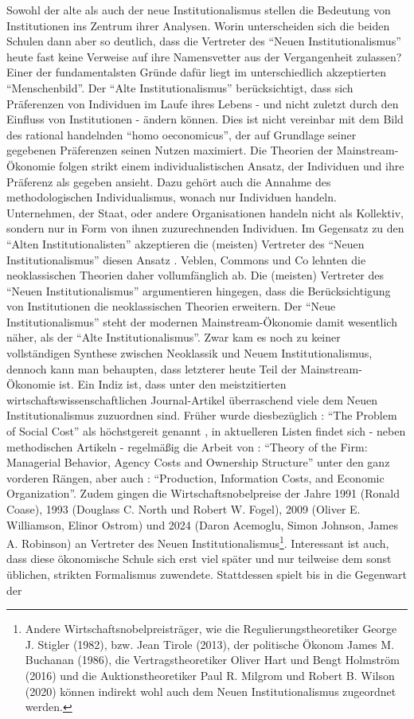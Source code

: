 Sowohl der alte als auch der neue Institutionalismus stellen die Bedeutung von Institutionen ins Zentrum ihrer Analysen. Worin unterscheiden sich die beiden Schulen dann aber so deutlich, dass die Vertreter des "`Neuen Institutionalismus"' heute fast keine Verweise auf ihre Namensvetter aus der Vergangenheit zulassen? Einer der fundamentalsten Gründe dafür liegt im unterschiedlich akzeptierten "`Menschenbild"'. Der "`Alte Institutionalismus"' berücksichtigt, dass sich Präferenzen von Individuen im Laufe ihres Lebens - und nicht zuletzt durch den Einfluss von Institutionen - ändern können. Dies ist nicht vereinbar mit dem Bild des rational handelnden "`homo oeconomicus"', der auf Grundlage seiner gegebenen Präferenzen seinen Nutzen maximiert. Die Theorien der Mainstream-Ökonomie folgen strikt einem individualistischen Ansatz, der Individuen und ihre Präferenz als gegeben ansieht. Dazu gehört auch die Annahme des methodologischen Individualismus, wonach nur Individuen handeln. Unternehmen, der Staat, oder andere Organisationen handeln nicht als Kollektiv, sondern nur in Form von ihnen zuzurechnenden Individuen. Im Gegensatz zu den "`Alten Institutionalisten"' akzeptieren die (meisten) Vertreter des "`Neuen Institutionalismus"' diesen Ansatz \parencite[S. 177]{Hodgson1998}. Veblen, Commons und Co lehnten die neoklassischen Theorien daher vollumfänglich ab. Die (meisten) Vertreter des "`Neuen Institutionalismus"' argumentieren hingegen, dass die Berücksichtigung von Institutionen die neoklassischen Theorien erweitern. Der "`Neue Institutionalismus"' steht der modernen Mainstream-Ökonomie damit wesentlich näher, als der "`Alte Institutionalismus"'. Zwar kam es noch zu keiner vollständigen Synthese zwischen Neoklassik und Neuem Institutionalismus, dennoch kann man behaupten, dass letzterer heute Teil der Mainstream-Ökonomie ist. Ein Indiz ist, dass unter den meistzitierten wirtschaftswissenschaftlichen Journal-Artikel überraschend viele dem Neuen Institutionalismus zuzuordnen sind. Früher wurde diesbezüglich \textcite{Coase1960}: "`The Problem of Social Cost"' als höchstgereit genannt \parencite{Coase1991}, in aktuelleren Listen \parencite{Kim2006, Mergio2016} findet sich - neben methodischen Artikeln - regelmäßig die Arbeit von \textcite{Jensen1976}: "`Theory of the Firm: Managerial Behavior, Agency Costs and Ownership Structure"' unter den ganz vorderen Rängen, aber auch \textcite{Alchian1972}: "`Production, Information Costs, and Economic Organization"'. Zudem gingen die Wirtschaftsnobelpreise der Jahre 1991 (Ronald Coase), 1993 (Douglass C. North und Robert W. Fogel), 2009 (Oliver E. Williamson, Elinor Ostrom) und 2024 (Daron Acemoglu, Simon Johnson, James A. Robinson) an Vertreter des Neuen Institutionalismus\footnote{Andere Wirtschaftsnobelpreisträger, wie die Regulierungstheoretiker George J. Stigler (1982), bzw. Jean Tirole (2013), der politische Ökonom James M. Buchanan (1986), die Vertragstheoretiker Oliver Hart und Bengt Holmström (2016) und die Auktionstheoretiker Paul R. Milgrom und Robert B. Wilson (2020) können indirekt wohl auch dem Neuen Institutionalismus zugeordnet werden.}. Interessant ist auch, dass diese ökonomische Schule sich erst viel später und nur teilweise dem sonst üblichen, strikten Formalismus zuwendete. Stattdessen spielt bis in die Gegenwart der 